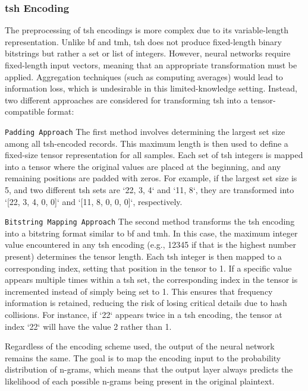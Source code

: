 \subsubsection{\ac{tsh} Encoding}
The preprocessing of \ac{tsh} encodings is more complex due to its variable-length representation.
Unlike \ac{bf} and \ac{tmh}, \ac{tsh} does not produce fixed-length binary bitstrings but rather a set or list of integers.
However, neural networks require fixed-length input vectors, meaning that an appropriate transformation must be applied.
Aggregation techniques (such as computing averages) would lead to information loss, which is undesirable in this limited-knowledge setting.
Instead, two different approaches are considered for transforming \ac{tsh} into a tensor-compatible format:

\texttt{Padding Approach}
The first method involves determining the largest set size among all \ac{tsh}-encoded records.
This maximum length is then used to define a fixed-size tensor representation for all samples.
Each set of \ac{tsh} integers is mapped into a tensor where the original values are placed at the beginning, and any remaining positions are padded with zeros.
For example, if the largest set size is 5, and two different \ac{tsh} sets are `{22, 3, 4}` and `{11, 8}`, they are transformed into `[22, 3, 4, 0, 0]` and `[11, 8, 0, 0, 0]`, respectively.

\texttt{Bitstring Mapping Approach}
The second method transforms the \ac{tsh} encoding into a bitstring format similar to \ac{bf} and \ac{tmh}.
In this case, the maximum integer value encountered in any \ac{tsh} encoding (e.g., 12345 if that is the highest number present) determines the tensor length.
Each \ac{tsh} integer is then mapped to a corresponding index, setting that position in the tensor to 1.
If a specific value appears multiple times within a \ac{tsh} set, the corresponding index in the tensor is incremented instead of simply being set to 1.
This ensures that frequency information is retained, reducing the risk of losing critical details due to hash collisions.
For instance, if `22` appears twice in a \ac{tsh} encoding, the tensor at index `22` will have the value 2 rather than 1.

Regardless of the encoding scheme used, the output of the neural network remains the same.
The goal is to map the encoding input to the probability distribution of n-grams, which means that the output layer always predicts the likelihood of each possible n-grams being present in the original plaintext.

